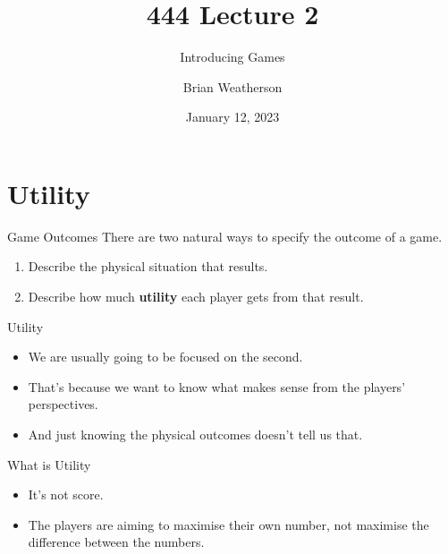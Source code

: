 \documentclass[
  14pt,
  letterpaper,
  ignorenonframetext,
  aspectratio=169,
  handout]{beamer}
\title{444 Lecture 2}
\subtitle{Introducing Games}
\author{Brian Weatherson}
\date{January 12, 2023}
\providecommand{\tightlist}{%
  \setlength{\itemsep}{0pt}\setlength{\parskip}{0pt}}\usepackage{longtable,booktabs,array}
\let\olditem\item
\renewcommand{\item}{%
\olditem\vspace{6pt}}
\begin{document}
\frame{\titlepage}
\ifdefined\Shaded\renewenvironment{Shaded}{\begin{tcolorbox}[interior hidden, frame hidden, breakable, borderline west={3pt}{0pt}{shadecolor}, sharp corners, boxrule=0pt, enhanced]}{\end{tcolorbox}}\fi

\hypertarget{utility}{%
\section{Utility}\label{utility}}

\begin{frame}{Game Outcomes}
\protect\hypertarget{game-outcomes}{}
There are two natural ways to specify the outcome of a game.

\begin{enumerate}
\tightlist
\item
  Describe the physical situation that results.
\item
  Describe how much \textbf{utility} each player gets from that result.
\end{enumerate}
\end{frame}

\begin{frame}{Utility}
\protect\hypertarget{utility-1}{}
\begin{itemize}[<+->]
\tightlist
\item
  We are usually going to be focused on the second.
\item
  That's because we want to know what makes sense from the players'
  perspectives.
\item
  And just knowing the physical outcomes doesn't tell us that.
\end{itemize}
\end{frame}

\begin{frame}{What is Utility}
\protect\hypertarget{what-is-utility}{}
\begin{itemize}[<+->]
\tightlist
\item
  It's not score.
\item
  The players are aiming to maximise their own number, not maximise the
  difference between the numbers.
\end{itemize}
\end{frame}
\end{document}
